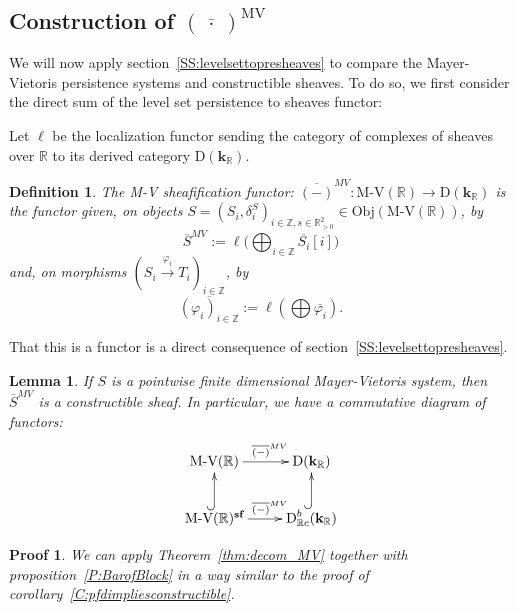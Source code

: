 \documentclass[a4paper, english, 11pt]{article}
\newcommand{\kk}[0]{\textbf{k}}
\newcommand{\0}{\vec{0}}
\newcommand{\R}[0]{\mathbb{R}}
\newcommand{\Z}[0]{\mathbb{Z}}
\newcommand{\D}[0]{\text{D}}
\newcommand{\Obj}[0]{\text{Obj}}
\newcommand{\s}{\textbf{sf}}
\newtheorem*{pf}{Proof} }
\newtheorem{lem}[prop]{Lemma}
\newtheorem{defi}[prop]{Definition}
\begin{document}
\subsection{Construction of $(\overline{~\cdot~ })^{\text{MV}}$}
We will now apply section~\ref{SS:levelsettopresheaves} to compare the Mayer-Vietoris persistence systems and constructible sheaves. To do so, we first consider the direct sum of the level set persistence to sheaves functor: 

Let $\ell$ be the localization functor sending the category of complexes of sheaves over $\R$ to its derived category $\D(\kk_\R)$.
\begin{defi}\label{D:MVtoSheaves} The \emph{M-V sheafification functor}: $\overline{(-)}^{MV}: \text{M-V}(\R) \to  \D(\kk_\R)$ is the functor given, on
objects $S=(S_i, \delta_i^S)_{i\in \Z, s\in \R^2_{>0}}\in \Obj(\text{M-V}(\R))$, by 
$$ \overline{S}^{MV} := \ell\Big(\bigoplus_{i\in \Z} \overline{S_i}[i]\Big)$$ and, on morphisms $(S_i\stackrel{\varphi_i}\to T_i)_{i\in \Z}$, by 
$$\overline{(\varphi_i)_{i\in \Z}} := \ell\left(\bigoplus \overline{\varphi_i}\right). $$ 
\end{defi}
That this is a functor is a direct consequence of section~\ref{SS:levelsettopresheaves}.

\begin{lem}
 If $S$ is a pointwise finite dimensional Mayer-Vietoris system, then $\overline{S}^{MV}$ is a constructible sheaf. In particular, we have a commutative diagram of functors:
 $$\xymatrix{ \text{M-V}(\R) \ar[r]^{\quad\overline{(-)}^{MV}} & \D(\kk_\R) \\ 
 \text{M-V}(\R)^{\s} \ar@{^{(}->}[u]\ar[r]^{\quad\overline{(-)}^{MV}} & \D^b_{\R c}(\kk_\R) \ar@{^{(}->}[u].}  $$
\end{lem}
\begin{pf}
 We can apply Theorem~\ref{thm:decom_MV} together with proposition~\ref{P:BarofBlock} in a way similar to the proof of corollary~\ref{C:pfdimpliesconstructible}.
\end{pf}
\end{document}
